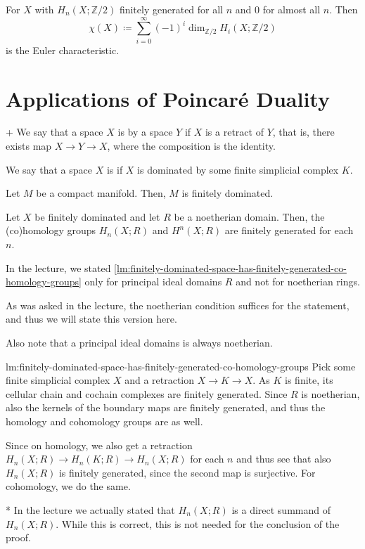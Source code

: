 \begin{definition}
  For $X$ with $H_n(X;\mathbb{Z}/2)$ finitely generated for all $n$
  and  $0$ for almost all $n$.
  Then
   \[
    \chi(X) \coloneqq \sum_{i=0}^{\infty} (-1)^i \dim_{\mathbb{Z}/2} H_i(X;\mathbb{Z}/2)
  \]
  is the Euler characteristic.
\end{definition}


\section{Applications of Poincaré Duality}

\begin{definition}+
  \label{def:finitely-dominated}
  We say that a space $X$ is  by a space $Y$ if  $X$
  is a retract of $Y$, that is, there exists map $X \to Y\to X$,
  where the composition is the identity.

  We say that a space $X$ is  if $X$ is
  dominated by some finite simplicial complex $K$.
\end{definition}

\begin{theorem}
  \label{thm:compact-manifold-is-retract-of-simplicial-complex}
  Let $M$ be a compact manifold.
  Then, $M$ is finitely dominated.
\end{theorem}

\begin{lemma}
  \label{lm:finitely-dominated-space-has-finitely-generated-co-homology-groups}
  Let $X$ be finitely dominated and let $R$ be a noetherian domain.
  Then, the (co)homology groups $H_n(X;R)$ and  $H^n(X;R)$ are finitely
  generated for each $n$.
\end{lemma}

\begin{editor}
  In the lecture, we stated
  \autoref{lm:finitely-dominated-space-has-finitely-generated-co-homology-groups}
  only for principal ideal domains $R$ and not for noetherian rings.

  As was asked in the lecture, the noetherian condition suffices for the
  statement, and thus we will state this version here.

  Also note that a principal ideal domains is always noetherian.
\end{editor}

\begin{refproof}{lm:finitely-dominated-space-has-finitely-generated-co-homology-groups}
  Pick some finite simplicial complex $X$ and a  retraction $X\to K\to X$.
  As $K$ is finite, its cellular chain and cochain complexes are finitely
  generated.
  Since $R$ is noetherian, also the kernels of the boundary maps are finitely
  generated, and thus the homology and cohomology groups are as well.

  Since on homology, we also get a retraction
  $H_n(X;R) \to H_n(K;R) \to H_n(X;R)$ for each $n$ and thus see that also
  $H_n(X;R)$ is finitely generated, since the second map is surjective.
  For cohomology, we do the same.
\end{refproof}

\begin{remark}*
  In the lecture we actually stated that $H_n(X;R)$ is a direct
  summand of $H_n(X;R)$.
  While this is correct, this is not needed for the conclusion of the proof.
\end{remark}
